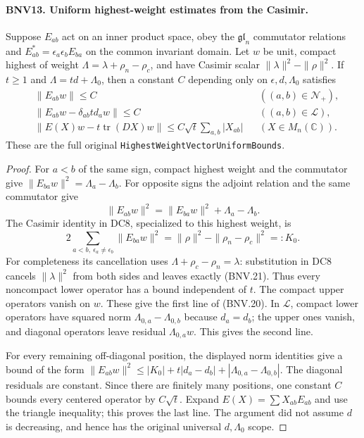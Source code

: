 \paragraph{BNV13. Uniform highest-weight estimates from the Casimir.}
\label{claim:BNV13}
Suppose $E_{ab}$ act on an inner product space, obey the
$\mathfrak{gl}_n$ commutator relations and
$E_{ab}^*=\epsilon_a\epsilon_b E_{ba}$ on the common invariant domain.
Let $w$ be unit, compact highest of weight
$\Lambda=\lambda+\rho_n-\rho_c$, and have Casimir scalar
$\|\lambda\|^2-\|\rho\|^2$.  If $t\ge1$ and
$\Lambda=td+\Lambda_0$, then a constant $C$ depending only on
$\epsilon,d,\Lambda_0$ satisfies
\[
 \begin{aligned}
 &\|E_{ab}w\|\le C &&((a,b)\in\mathcal N_+),\\
 &\|E_{ab}w-\delta_{ab}td_aw\|\le C
                  &&((a,b)\in\mathcal L),\\
 &\left\|E(X)w-t\operatorname{tr}(DX)w\right\|
       \le C\sqrt t\sum_{a,b}|X_{ab}| &&(X\in M_n(\mathbb C)).
 \end{aligned}
 \tag{BNV.20}
\]
These are the full original \texttt{HighestWeightVectorUniformBounds}.

\begin{proof}
For $a<b$ of the same sign, compact highest weight and the commutator
give $\|E_{ba}w\|^2=\Lambda_a-\Lambda_b$.
For opposite signs the adjoint relation and the same commutator give
\[
 \|E_{ab}w\|^2=\|E_{ba}w\|^2+\Lambda_a-\Lambda_b.
\]
The Casimir identity in DC8, specialized to this highest weight, is
\[
 2\sum_{a<b,\ \epsilon_a\ne\epsilon_b}\|E_{ba}w\|^2
       =\|\rho\|^2-\|\rho_n-\rho_c\|^2=:K_0.
 \tag{BNV.21}
\]
For completeness its cancellation uses
$\Lambda+\rho_c-\rho_n=\lambda$: substitution in DC8 cancels
$\|\lambda\|^2$ from both sides and leaves exactly (BNV.21).
Thus every noncompact lower operator has a bound independent of $t$.
The compact upper operators vanish on $w$.  These give the first line
of (BNV.20).  In $\mathcal L$, compact lower operators have squared norm
$\Lambda_{0,a}-\Lambda_{0,b}$ because $d_a=d_b$; the upper ones vanish,
and diagonal operators leave residual $\Lambda_{0,a}w$.  This gives the
second line.

For every remaining off-diagonal position, the displayed norm identities
give a bound of the form
$\|E_{ab}w\|^2\le |K_0|+t|d_a-d_b|+|\Lambda_{0,a}-\Lambda_{0,b}|$.
The diagonal residuals are constant.  Since there are finitely many
positions, one constant $C$ bounds every centered operator by $C\sqrt t$.
Expand $E(X)=\sum X_{ab}E_{ab}$ and use the triangle inequality; this
proves the last line.  The argument did not assume $d$ is decreasing,
and hence has the original universal $d,\Lambda_0$ scope.
\end{proof}

